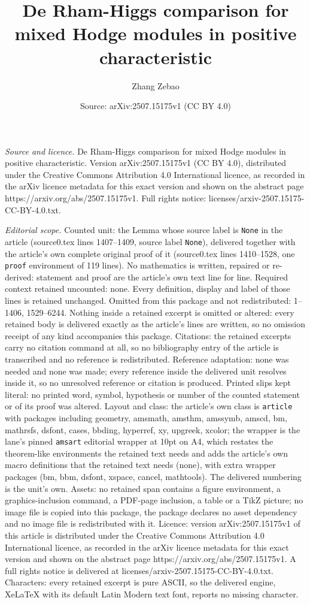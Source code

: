 \documentclass[10pt,a4paper]{amsart}
\title[De Rham-Higgs comparison for mixed Hodge modules in positive]{De Rham-Higgs comparison for mixed Hodge modules in positive characteristic}
\author{Zhang Zebao}
\date{Source: arXiv:2507.15175v1 (CC BY 4.0)}
\begin{document}
\maketitle

\noindent\emph{Source and licence.} De Rham-Higgs comparison for mixed Hodge modules in positive characteristic. Version arXiv:2507.15175v1 (CC BY 4.0), distributed under the Creative Commons Attribution 4.0 International licence, as recorded in the arXiv licence metadata for this exact version and shown on the abstract page https://arxiv.org/abs/2507.15175v1. Full rights notice: licenses/arxiv-2507.15175-CC-BY-4.0.txt.\par\smallskip

\noindent\textit{Editorial scope.} Counted unit: the Lemma whose source label is \texttt{None} in the article (source0.tex lines 1407--1409, source label \texttt{None}), delivered together with the article's own complete original proof of it (source0.tex lines 1410--1528, one \texttt{proof} environment of 119 lines). No mathematics is written, repaired or re-derived: statement and proof are the article's own text line for line. Required context retained uncounted: none. Every definition, display and label of those lines is retained unchanged. Omitted from this package and not redistributed: 1--1406, 1529--6244. Nothing inside a retained excerpt is omitted or altered: every retained body is delivered exactly as the article's lines are written, so no omission receipt of any kind accompanies this package. Citations: the retained excerpts carry no citation command at all, so no bibliography entry of the article is transcribed and no reference is redistributed. Reference adaptation: none was needed and none was made; every reference inside the delivered unit resolves inside it, so no unresolved reference or citation is produced. Printed slips kept literal: no printed word, symbol, hypothesis or number of the counted statement or of its proof was altered. Layout and class: the article's own class is \texttt{article} with packages including geometry, amsmath, amsthm, amssymb, amscd, bm, mathrsfs, dsfont, cases, bbding, hyperref, xy, upgreek, xcolor; the wrapper is the lane's pinned \texttt{amsart} editorial wrapper at 10pt on A4, which restates the theorem-like environments the retained text needs and adds the article's own macro definitions that the retained text needs (none), with extra wrapper packages (bm, bbm, dsfont, xspace, cancel, mathtools). The delivered numbering is the unit's own. Assets: no retained span contains a figure environment, a graphics-inclusion command, a PDF-page inclusion, a table or a TikZ picture; no image file is copied into this package, the package declares no asset dependency and no image file is redistributed with it. Licence: version arXiv:2507.15175v1 of this article is distributed under the Creative Commons Attribution 4.0 International licence, as recorded in the arXiv licence metadata for this exact version and shown on the abstract page https://arxiv.org/abs/2507.15175v1. A full rights notice is delivered at licenses/arxiv-2507.15175-CC-BY-4.0.txt. Characters: every retained excerpt is pure ASCII, so the delivered engine, XeLaTeX with its default Latin Modern text font, reports no missing character.
\end{document}
